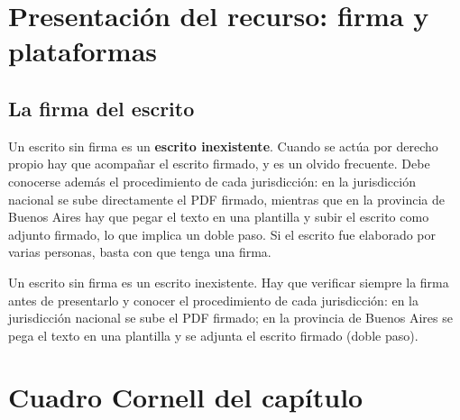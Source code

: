 \documentclass[12pt,oneside]{book}
\begin{document}
\section{Presentación del recurso: firma y plataformas}

\subsection{La firma del escrito}

Un escrito sin firma es un \textbf{escrito inexistente}. Cuando se actúa por derecho propio hay que acompañar el escrito firmado, y es un olvido frecuente. Debe conocerse además el procedimiento de cada jurisdicción: en la jurisdicción nacional se sube directamente el PDF firmado, mientras que en la provincia de Buenos Aires hay que pegar el texto en una plantilla y subir el escrito como adjunto firmado, lo que implica un doble paso. Si el escrito fue elaborado por varias personas, basta con que tenga una firma.

\begin{important}
Un escrito sin firma es un escrito inexistente. Hay que verificar siempre la firma antes de presentarlo y conocer el procedimiento de cada jurisdicción: en la jurisdicción nacional se sube el PDF firmado; en la provincia de Buenos Aires se pega el texto en una plantilla y se adjunta el escrito firmado (doble paso).
\end{important}

\section{Cuadro Cornell del capítulo}
\end{document}
